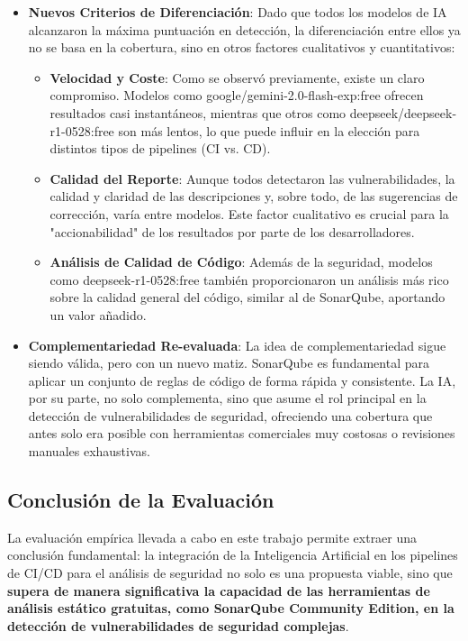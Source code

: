 \begin{itemize}
    \item \textbf{Nuevos Criterios de Diferenciación}: Dado que todos los modelos de IA alcanzaron la máxima puntuación en detección, la diferenciación entre ellos ya no se basa en la cobertura, sino en otros factores cualitativos y cuantitativos:
        \begin{itemize}
            \item \textbf{Velocidad y Coste}: Como se observó previamente, existe un claro compromiso. Modelos como google/gemini-2.0-flash-exp:free ofrecen resultados casi instantáneos, mientras que otros como deepseek/deepseek-r1-0528:free son más lentos, lo que puede influir en la elección para distintos tipos de pipelines (CI vs. CD).
            \item \textbf{Calidad del Reporte}: Aunque todos detectaron las vulnerabilidades, la calidad y claridad de las descripciones y, sobre todo, de las sugerencias de corrección, varía entre modelos. Este factor cualitativo es crucial para la "accionabilidad" de los resultados por parte de los desarrolladores.
            \item \textbf{Análisis de Calidad de Código}: Además de la seguridad, modelos como deepseek-r1-0528:free también proporcionaron un análisis más rico sobre la calidad general del código, similar al de SonarQube, aportando un valor añadido.
        \end{itemize}

    \item \textbf{Complementariedad Re-evaluada}: La idea de complementariedad sigue siendo válida, pero con un nuevo matiz. SonarQube es fundamental para aplicar un conjunto de reglas de código de forma rápida y consistente. La IA, por su parte, no solo complementa, sino que asume el rol principal en la detección de vulnerabilidades de seguridad, ofreciendo una cobertura que antes solo era posible con herramientas comerciales muy costosas o revisiones manuales exhaustivas.
\end{itemize}

\subsection{Conclusión de la Evaluación}

La evaluación empírica llevada a cabo en este trabajo permite extraer una conclusión fundamental: la integración de la Inteligencia Artificial en los pipelines de CI/CD para el análisis de seguridad no solo es una propuesta viable, sino que \textbf{supera de manera significativa la capacidad de las herramientas de análisis estático gratuitas, como SonarQube Community Edition, en la detección de vulnerabilidades de seguridad complejas}.

